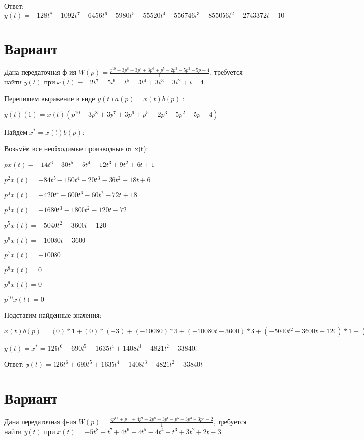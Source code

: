 \documentclass{article}
\begin{document}
{{{{{Ответ: $y(t) = -128t^{8}-1092t^{7}+6456t^{6}-5980t^{5}-55520t^{4}-556746t^{3}+855056t^{2}-2743372t-10$

\section{Вариант}

Дана передаточная ф-ия $W(p)=\frac{p^{10}-3p^{8}+3p^{7}+3p^{6}+p^{5}-2p^{3}-5p^{2}-5p-4}{1}$, требуется найти $y(t)$ при $x(t)=-2t^{7}-5t^{6}-t^{5}-3t^{4}+3t^{3}+3t^{2}+t+4$

Перепишем выражение в виде $y(t)a(p)=x(t)b(p)$ :

$y(t)(1)=x(t)(p^{10}-3p^{8}+3p^{7}+3p^{6}+p^{5}-2p^{3}-5p^{2}-5p-4)$

Найдём $x^*=x(t)b(p)$:

Возьмём все необходимые производные от x(t):

$px(t)=-14t^{6}-30t^{5}-5t^{4}-12t^{3}+9t^{2}+6t+1$

$p^2x(t)=-84t^{5}-150t^{4}-20t^{3}-36t^{2}+18t+6$

$p^3x(t)=-420t^{4}-600t^{3}-60t^{2}-72t+18$

$p^4x(t)=-1680t^{3}-1800t^{2}-120t-72$

$p^5x(t)=-5040t^{2}-3600t-120$

$p^6x(t)=-10080t-3600$

$p^7x(t)=-10080$

$p^8x(t)=0$

$p^9x(t)=0$

$p^10x(t)=0$

Подставим найденные значения:

$x(t)b(p) = (0)*1+(0)*(-3)+(-10080)*3+(-10080t-3600)*3+(-5040t^{2}-3600t-120)*1+(-420t^{4}-600t^{3}-60t^{2}-72t+18)*(-2)+(-84t^{5}-150t^{4}-20t^{3}-36t^{2}+18t+6)*(-5)+(-14t^{6}-30t^{5}-5t^{4}-12t^{3}+9t^{2}+6t+1)*(-5)+(-14t^{6}-30t^{5}-5t^{4}-12t^{3}+9t^{2}+6t+1)*(-4)=126t^{6}+690t^{5}+1635t^{4}+1408t^{3}-4821t^{2}-33840t$





$y(t)=x^*=126t^{6}+690t^{5}+1635t^{4}+1408t^{3}-4821t^{2}-33840t$

Ответ: $y(t) = 126t^{6}+690t^{5}+1635t^{4}+1408t^{3}-4821t^{2}-33840t$

\section{Вариант}

Дана передаточная ф-ия $W(p)=\frac{4p^{11}+p^{10}+4p^{9}-2p^{8}-3p^{6}-p^{5}-3p^{3}-3p^{2}-2}{1}$, требуется найти $y(t)$ при $x(t)=-5t^{8}+t^{7}+4t^{6}-4t^{5}-4t^{4}-t^{3}+3t^{2}+2t-3$

}}}}}
\end{document}
